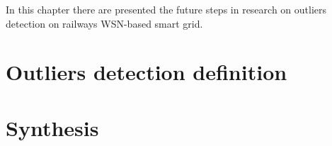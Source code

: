 In this chapter there are presented the future steps in research on outliers detection on railways WSN-based smart grid.


\section{Outliers detection definition}

\lipsum[1]


\section{Synthesis}